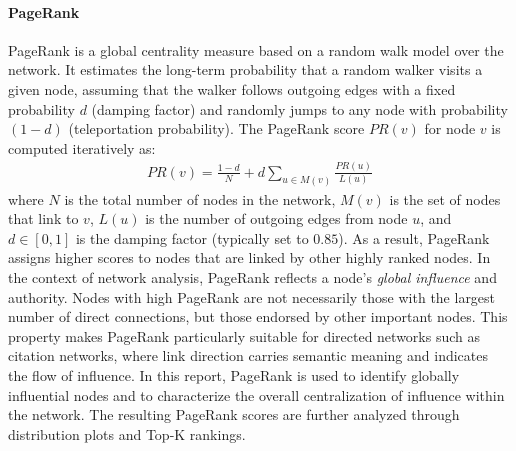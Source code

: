 \paragraph{PageRank}
PageRank\citep{websearchengine, googlepagerank}
is a global centrality measure based on a random walk model over the network. 
It estimates the long-term probability that a random walker visits a given node, 
assuming that the walker follows outgoing edges with a fixed probability $d$ (damping factor) and randomly jumps to any node with probability $(1-d)$ (teleportation probability). 
The PageRank score $PR(v)$ for node $v$ is computed iteratively as:
\begin{align} \label{form:pagerank}
    PR(v) = \frac{1-d}{N} + d \sum_{u \in M(v)} \frac{PR(u)}{L(u)}
\end{align}
where $N$ is the total number of nodes in the network, $M(v)$ is the set of nodes that link to $v$, 
$L(u)$ is the number of outgoing edges from node $u$, and $d \in [0,1]$ is the damping factor (typically set to $0.85$).
As a result, PageRank assigns higher scores to nodes that are linked by other highly ranked nodes.
In the context of network analysis, 
PageRank reflects a node's \emph{global influence} and authority. 
Nodes with high PageRank are not necessarily those with the largest number of direct connections, 
but those endorsed by other important nodes. 
This property makes PageRank particularly suitable for directed networks such as citation networks, 
where link direction carries semantic meaning and indicates the flow of influence.
In this report, PageRank is used to identify globally influential nodes and to characterize the overall centralization of influence within the network. 
The resulting PageRank scores are further analyzed through distribution plots and Top-K rankings.

